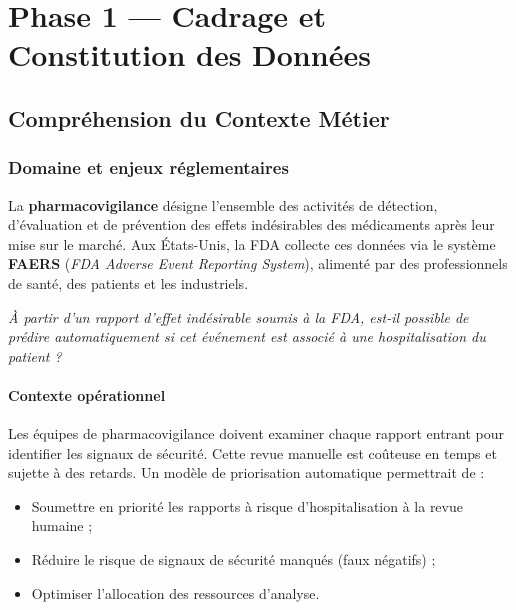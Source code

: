 \documentclass[11pt,a4paper,twoside,openright]{report}
\begin{document}
\clearpage

\part{Phase 1 — Cadrage et Constitution des Données}

\chapter{Compréhension du Contexte Métier}
\label{ch:metier}

\section{Domaine et enjeux réglementaires}

La \textbf{pharmacovigilance} désigne l'ensemble des activités de détection, d'évaluation et de prévention des effets indésirables des médicaments après leur mise sur le marché. Aux États-Unis, la FDA collecte ces données via le système \textbf{FAERS} (\textit{FDA Adverse Event Reporting System}), alimenté par des professionnels de santé, des patients et les industriels.

\begin{keybox}
\textit{À partir d'un rapport d'effet indésirable soumis à la FDA, est-il possible de prédire automatiquement si cet événement est associé à une hospitalisation du patient ?}
\end{keybox}

\subsection{Contexte opérationnel}

Les équipes de pharmacovigilance doivent examiner chaque rapport entrant pour identifier les signaux de sécurité. Cette revue manuelle est coûteuse en temps et sujette à des retards. Un modèle de priorisation automatique permettrait de :
\begin{itemize}
  \item Soumettre en priorité les rapports à risque d'hospitalisation à la revue humaine ;
  \item Réduire le risque de signaux de sécurité manqués (faux négatifs) ;
  \item Optimiser l'allocation des ressources d'analyse.
\end{itemize}
\end{document}
